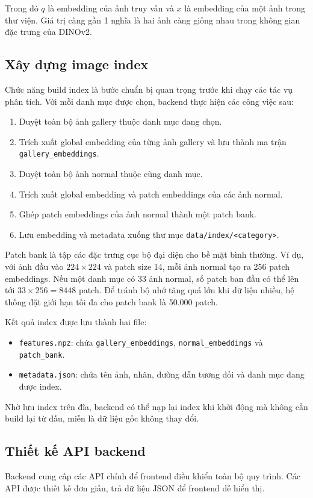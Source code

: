 Trong đó $q$ là embedding của ảnh truy vấn và $x$ là embedding của một ảnh trong thư viện. Giá trị càng gần 1 nghĩa là hai ảnh càng giống nhau trong không gian đặc trưng của DINOv2.

\subsection{Xây dựng image index}
Chức năng build index là bước chuẩn bị quan trọng trước khi chạy các tác vụ phân tích. Với mỗi danh mục được chọn, backend thực hiện các công việc sau:

\begin{enumerate}
    \item Duyệt toàn bộ ảnh gallery thuộc danh mục đang chọn.
    \item Trích xuất global embedding của từng ảnh gallery và lưu thành ma trận \texttt{gallery\_embeddings}.
    \item Duyệt toàn bộ ảnh normal thuộc cùng danh mục.
    \item Trích xuất global embedding và patch embeddings của các ảnh normal.
    \item Ghép patch embeddings của ảnh normal thành một patch bank.
    \item Lưu embedding và metadata xuống thư mục \texttt{data/index/<category>}.
\end{enumerate}

Patch bank là tập các đặc trưng cục bộ đại diện cho bề mặt bình thường. Ví dụ, với ảnh đầu vào $224 \times 224$ và patch size 14, mỗi ảnh normal tạo ra 256 patch embeddings. Nếu một danh mục có 33 ảnh normal, số patch ban đầu có thể lên tới $33 \times 256 = 8448$ patch. Để tránh bộ nhớ tăng quá lớn khi dữ liệu nhiều, hệ thống đặt giới hạn tối đa cho patch bank là 50.000 patch.

Kết quả index được lưu thành hai file:

\begin{itemize}
    \item \texttt{features.npz}: chứa \texttt{gallery\_embeddings}, \texttt{normal\_embeddings} và \texttt{patch\_bank}.
    \item \texttt{metadata.json}: chứa tên ảnh, nhãn, đường dẫn tương đối và danh mục đang được index.
\end{itemize}

Nhờ lưu index trên đĩa, backend có thể nạp lại index khi khởi động mà không cần build lại từ đầu, miễn là dữ liệu gốc không thay đổi.

\subsection{Thiết kế API backend}
Backend cung cấp các API chính để frontend điều khiển toàn bộ quy trình. Các API được thiết kế đơn giản, trả dữ liệu JSON để frontend dễ hiển thị.

